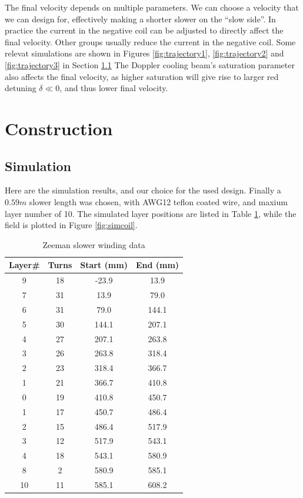 \documentclass[12pt,a4paper]{article}
\begin{document}
The final velocity depends on multiple parameters. We can choose a velocity that we can design for, effectively making a shorter slower on the ``slow side''. In practice the current in the negative coil can be adjusted to directly affect the final velocity. Other groups usually reduce the current in the negative coil. Some relevat simulations are shown in Figures \ref{fig:trajectory1}, \ref{fig:trajectory2} and \ref{fig:trajectory3} in Section \ref{seq:sim}  The Doppler cooling beam's saturation parameter also affects the final velocity, as higher saturation will give rise to larger red detuning $\delta \ll 0$, and thus lower final velocity.


\section{Construction}

\subsection{Simulation}
\label{seq:sim}

Here are the simulation results, and our choice for the used design. 
Finally a $0.59 m$ slower length was chosen, with AWG12 teflon coated wire, and maxium layer number of 10. The simulated layer positions are listed in Table \ref{tab:layers}, while the field is plotted in Figure \ref{fig:simcoil}.

\begin{table}[htb]
\begin{center}
\begin{tabular}{|c|c|c|c|}
\hline 
\textbf{Layer\#} & \textbf{Turns} & \textbf{Start (mm)} & \textbf{End (mm)} \\ 
\hline 
9 & 18 & -23.9 & 13.9 \\ 
\hline 
7 & 31 & 13.9 & 79.0 \\ 
\hline 
6 & 31 & 79.0 & 144.1 \\ 
\hline 
5 & 30 & 144.1 & 207.1 \\ 
\hline 
4 & 27 & 207.1 & 263.8 \\ 
\hline 
3 & 26 & 263.8 & 318.4 \\ 
\hline 
2 & 23 & 318.4 & 366.7 \\ 
\hline 
1 & 21 & 366.7 & 410.8 \\ 
\hline 
0 & 19 & 410.8 & 450.7 \\ 
\hline 
1 & 17 & 450.7 & 486.4 \\ 
\hline 
2 & 15 & 486.4 & 517.9 \\ 
\hline 
3 & 12 & 517.9 & 543.1 \\ 
\hline 
4 & 18 & 543.1 & 580.9 \\ 
\hline 
8 & 2 & 580.9 & 585.1 \\ 
\hline 
10 & 11 & 585.1 & 608.2 \\ 
\hline 
\end{tabular} 
\end{center}
\caption{Zeeman slower winding data}
\label{tab:layers}
\end{table}
\end{document}
